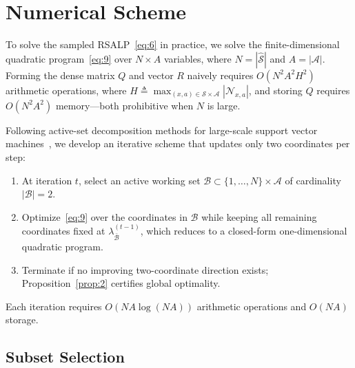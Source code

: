 \documentclass[11pt,letterpaper]{article}
\newcommand{\defeq}{\triangleq}
\theoremstyle{definition}
\begin{document}
\section{Numerical Scheme}
\label{sec:numerical}

To solve the sampled RSALP~\eqref{eq:6} in practice, we solve the finite-dimensional quadratic program~\eqref{eq:9} over $N \times A$ variables, where $N = |\widehat{\mathcal{S}}|$ and $A = |\mathcal{A}|$. Forming the dense matrix $Q$ and vector $R$ naively requires $O(N^2 A^2 H^2)$ arithmetic operations, where $H \defeq \max_{(x,a)\in\mathcal{S}\times\mathcal{A}} |\mathcal{N}_{x,a}|$, and storing $Q$ requires $O(N^2 A^2)$ memory—both prohibitive when $N$ is large.

Following active-set decomposition methods for large-scale support vector machines~\cite{OsunaFreundGirosi97,Joachims99}, we develop an iterative scheme that updates only two coordinates per step:
\begin{enumerate}[leftmargin=2em,itemsep=2pt]
  \item At iteration $t$, select an active working set $\mathcal{B} \subset \{1,\ldots,N\}\times\mathcal{A}$ of cardinality $|\mathcal{B}| = 2$.
  \item Optimize~\eqref{eq:9} over the coordinates in $\mathcal{B}$ while keeping all remaining coordinates fixed at $\lambda_{\bar{\mathcal{B}}}^{(t-1)}$, which reduces to a closed-form one-dimensional quadratic program.
  \item Terminate if no improving two-coordinate direction exists; Proposition~\ref{prop:2} certifies global optimality.
\end{enumerate}
Each iteration requires $O(NA\log(NA))$ arithmetic operations and $O(NA)$ storage.

\subsection{Subset Selection}
\label{sec:subset}
\end{document}
